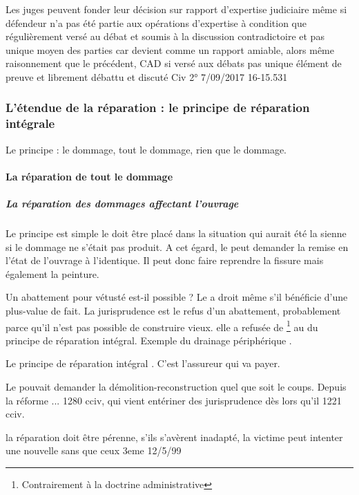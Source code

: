 			Les juges peuvent fonder leur décision sur rapport d’expertise judiciaire même si défendeur n’a pas été partie aux opérations d’expertise à condition que régulièrement versé au débat et soumis à la discussion contradictoire et pas unique moyen des parties car devient comme un rapport amiable, alors même raisonnement que le précédent, CAD si versé aux débats pas unique élément de preuve et librement débattu et discuté Civ 2° 7/09/2017 16-15.531


		\subsubsection[L'étendue de la réparation]{L'étendue de la réparation : le principe de réparation intégrale}

			Le principe : le dommage, tout le dommage, rien que le dommage.

			\paragraph{La réparation de tout le dommage}

				\subparagraph{La réparation des dommages affectant l'ouvrage} Le principe est simple le \Mo doit être placé dans la situation qui aurait été la sienne si le dommage ne s'était pas produit. A cet égard, le \Mo peut demander la remise en l'état de l'ouvrage à l'identique. Il peut donc faire reprendre la fissure mais également la peinture.

				Un abattement pour vétusté est-il possible ? Le \Mo a droit \aCompleter même s'il bénéficie d'une plus-value de fait. La jurisprudence est le refus d'un abattement, probablement parce qu'il n'est pas possible de construire vieux. elle a refusée de \aCompleter\footnote{Contrairement à la doctrine administrative} au du principe de réparation intégral. Exemple du drainage périphérique \aCompleter.

				Le principe de réparation intégral \aCompleter. C'est l'assureur qui va payer.

				Le \Mo pouvait demander la démolition-reconstruction quel que soit le coups. Depuis la réforme ... 1280 cciv, qui vient entériner des jurisprudence dès lors qu'il 1221 cciv.

				la réparation doit être pérenne, s'ils s'avèrent inadapté, la victime peut intenter une nouvelle  sans que ceux 3eme 12/5/99

